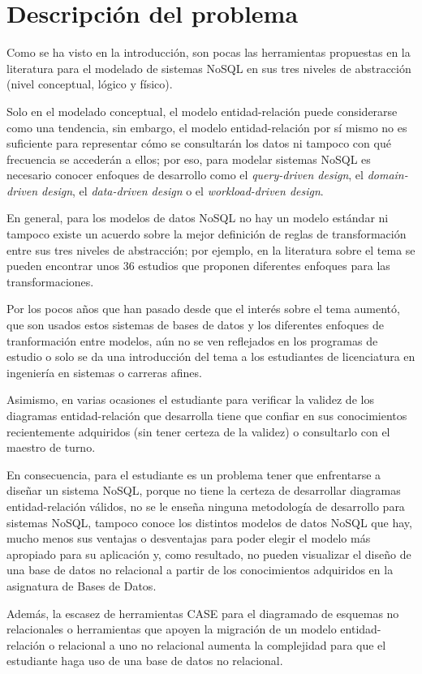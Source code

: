 \section{Descripción del problema}
Como se ha visto en la introducción, son pocas las herramientas propuestas en la literatura para el modelado de sistemas NoSQL en sus tres niveles de abstracción (nivel conceptual, lógico y físico).


Solo en el modelado conceptual, el modelo entidad-relación puede considerarse como una tendencia, sin embargo, el modelo entidad-relación por sí mismo no es suficiente para representar cómo se consultarán los datos ni tampoco con qué frecuencia se accederán a ellos; por eso, para modelar sistemas NoSQL es necesario conocer enfoques de desarrollo como el \textit{query-driven design}, el \textit{domain-driven design}, el \textit{data-driven design} o el \textit{workload-driven design}.


En general, para los modelos de datos NoSQL no hay un modelo estándar ni tampoco existe un acuerdo sobre la mejor definición de reglas de transformación entre sus tres niveles de abstracción; por ejemplo, en la literatura sobre el tema se pueden encontrar unos 36 estudios que proponen diferentes enfoques para las transformaciones.


Por los pocos años que han pasado desde que el interés sobre el tema aumentó, que son usados estos sistemas de bases de datos y los diferentes enfoques de tranformación entre modelos, aún no se ven reflejados en los programas de estudio o solo se da una introducción del tema a los estudiantes de licenciatura en ingeniería en sistemas o carreras afines. 


Asimismo, en varias ocasiones el estudiante para verificar la validez de los diagramas entidad-relación que desarrolla tiene que confiar en sus conocimientos recientemente adquiridos (sin tener certeza de la validez) o consultarlo con el maestro de turno.


En consecuencia, para el estudiante es un problema tener que enfrentarse a diseñar un sistema NoSQL, porque no tiene la certeza de desarrollar diagramas entidad-relación válidos, no se le enseña ninguna metodología de desarrollo para sistemas NoSQL, tampoco conoce los distintos modelos de datos NoSQL que hay, mucho menos sus ventajas o desventajas para poder elegir el modelo más apropiado para su aplicación y, como resultado, no pueden visualizar el diseño de una base de datos no relacional a partir de los conocimientos adquiridos en la asignatura de Bases de Datos.


Además, la escasez de herramientas CASE para el diagramado de esquemas no relacionales o herramientas que apoyen la migración de un modelo entidad-relación o relacional a uno no relacional aumenta la complejidad para que el estudiante haga uso de una base de datos no relacional.
